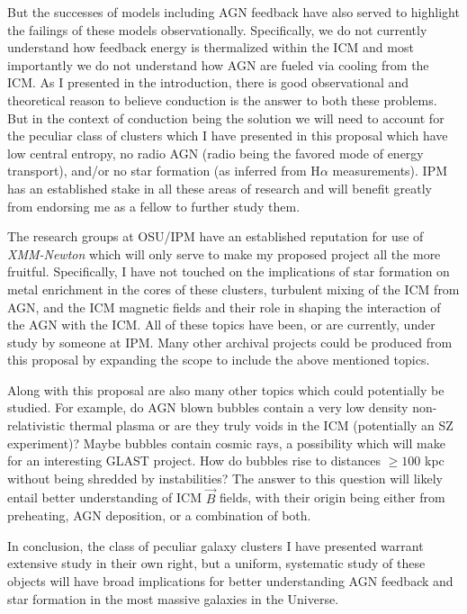 \documentclass[11pt]{article}
\begin{document}
But the successes of models including AGN feedback have also served to
highlight the failings of these models observationally. Specifically,
we do not currently understand how feedback energy is thermalized
within the ICM and most importantly we do not understand how AGN are
fueled via cooling from the ICM. As I presented in the introduction,
there is good observational and theoretical reason to believe
conduction is the answer to both these problems. But in the context of
conduction being the solution we will need to account for the peculiar
class of clusters which I have presented in this proposal which 
have low central entropy, no radio AGN (radio being the favored
mode of energy transport), and/or no star formation (as inferred from
H${\alpha}$ measurements). IPM has an established stake in all these
areas of research and will benefit greatly from endorsing me as a
fellow to further study them.

The research groups at OSU/IPM have an established reputation for use of
{\it XMM-Newton} which will only serve to make my proposed project all
the more fruitful. Specifically, I have not touched on the
implications of star formation on metal enrichment in the cores of
these clusters, turbulent mixing of the ICM from AGN, and the
ICM magnetic fields and their role in shaping the interaction of the
AGN with the ICM. All of these topics have been, or are currently,
under study by someone at IPM. Many other archival projects could be
produced from this proposal by expanding the scope to include the
above mentioned topics.

Along with this proposal are also many other topics which could
potentially be studied. For example, do AGN blown bubbles contain a very low
density non-relativistic thermal plasma or are they truly voids in the
ICM (potentially an SZ experiment)? Maybe bubbles contain cosmic rays,
a possibility which will make for an interesting GLAST project. How do
bubbles rise to distances $\geq 100$ kpc without being shredded by
instabilities? The answer to this question will likely entail better
understanding of ICM $\vec{B}$ fields, with their origin being either
from preheating, AGN deposition, or a combination of both.

In conclusion, the class of peculiar galaxy clusters I have presented
warrant extensive study in their own right, but a uniform, systematic
study of these objects will have broad implications for better
understanding AGN feedback and star formation in the most massive
galaxies in the Universe.
\end{document}

